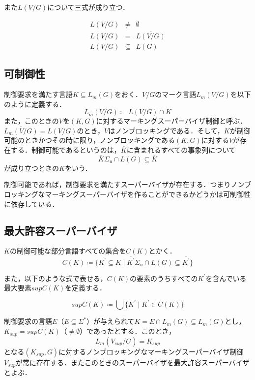 また$L(V/G)$について三式が成り立つ．

\begin{eqnarray}
    L(V/G)&\neq&\emptyset\\L(V/G)&=&\overline{L(V/G)}\\L(V/G)&\subseteq&L(G)
\end{eqnarray}


\subsection{可制御性}

制御要求を満たす言語$K \subseteq L_m(G)$をおく．$V/G$のマーク言語$L_m(V/G)$を以下のように定義する．
$$L_m(V/G) \coloneqq L(V/G) \cap K$$
また，このときの$V$を$(K, G)$に対するマーキングスーパーバイザ制御と呼ぶ．
$\overline{L_m(V/G)} = L(V/G)$のとき，$V$はノンブロッキングである．そして，$K$が制御可能のときかつその時に限り，ノンブロッキングである$(K,G)$に対する$V$が存在する．制御可能であるというのは，$\overline{K}$に含まれるすべての事象列について
\begin{equation}
    \overline{K}\Sigma_u\cap L(G)\subseteq\overline{K}
\end{equation} 
が成り立つときの$K$をいう．


制御可能であれば，制御要求を満たすスーパーバイザが存在する．つまりノンブロッキングなマーキングスーパーバイザを作ることができるかどうかは可制御性に依存している．


\subsection{最大許容スーパーバイザ}

$K$の制御可能な部分言語すべての集合を$C(K)$とかく．
\begin{equation}
    C(K)\coloneqq\{K^\prime\subseteq K\mid\overline{K^\prime}\Sigma_u\cap L(G)\subseteq\overline{K^\prime}\}
\end{equation}

また，以下のような式で表せる，$C(K)$の要素のうちすべての$K^\prime$を含んでいる最大要素$supC(K)$を定義する．

\begin{equation}
    supC(K) \coloneqq \bigcup\{K^\prime\mid K^\prime\in C(K)\}
\end{equation}

制御要求の言語$E（E\subseteq\Sigma^\ast）$が与えられて$K=E\cap L_m(G)\subseteq L_m(G)$とし，$K_{sup}=supC(K)$（$\neq\emptyset$）であったとする．このとき，
\begin{equation}
    L_m(V_{sup}/G)=K_{sup}
\end{equation}
となる$(K_{sup},G)$に対するノンブロッキングなマーキングスーパーバイザ制御$V_{sup}$が常に存在する．またこのときのスーパーバイザを最大許容スーパーバイザとよぶ．
